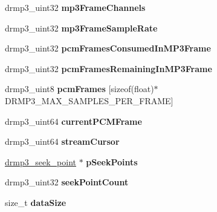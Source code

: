 \begin{DoxyCompactItemize}
\item 
\hypertarget{structdrmp3_aec49fe9de2778f11bb2013957fc12029}{drmp3\-\_\-uint32 {\bfseries mp3\-Frame\-Channels}}\label{structdrmp3_aec49fe9de2778f11bb2013957fc12029}

\item 
\hypertarget{structdrmp3_ade76fd0c402a551a22c0a06a0b8eb5dc}{drmp3\-\_\-uint32 {\bfseries mp3\-Frame\-Sample\-Rate}}\label{structdrmp3_ade76fd0c402a551a22c0a06a0b8eb5dc}

\item 
\hypertarget{structdrmp3_a57052dc84770d6a2789b40388101af39}{drmp3\-\_\-uint32 {\bfseries pcm\-Frames\-Consumed\-In\-M\-P3\-Frame}}\label{structdrmp3_a57052dc84770d6a2789b40388101af39}

\item 
\hypertarget{structdrmp3_ae3017f4bdc17a2df39c4f635bbc875d6}{drmp3\-\_\-uint32 {\bfseries pcm\-Frames\-Remaining\-In\-M\-P3\-Frame}}\label{structdrmp3_ae3017f4bdc17a2df39c4f635bbc875d6}

\item 
\hypertarget{structdrmp3_a023dfacc5f195ba44287ed3ddefffe16}{drmp3\-\_\-uint8 {\bfseries pcm\-Frames} \mbox{[}sizeof(float)$\ast$D\-R\-M\-P3\-\_\-\-M\-A\-X\-\_\-\-S\-A\-M\-P\-L\-E\-S\-\_\-\-P\-E\-R\-\_\-\-F\-R\-A\-M\-E\mbox{]}}\label{structdrmp3_a023dfacc5f195ba44287ed3ddefffe16}

\item 
\hypertarget{structdrmp3_a6500ce0ed15aa4b63622ca9f10b8011e}{drmp3\-\_\-uint64 {\bfseries current\-P\-C\-M\-Frame}}\label{structdrmp3_a6500ce0ed15aa4b63622ca9f10b8011e}

\item 
\hypertarget{structdrmp3_a89971e4af6f62c59f99a1c908690efe3}{drmp3\-\_\-uint64 {\bfseries stream\-Cursor}}\label{structdrmp3_a89971e4af6f62c59f99a1c908690efe3}

\item 
\hypertarget{structdrmp3_ae13ed70982604f33706b9f4a3fd40e76}{\hyperlink{structdrmp3__seek__point}{drmp3\-\_\-seek\-\_\-point} $\ast$ {\bfseries p\-Seek\-Points}}\label{structdrmp3_ae13ed70982604f33706b9f4a3fd40e76}

\item 
\hypertarget{structdrmp3_ae9095cc4be150c2ed98c9a4f53041f19}{drmp3\-\_\-uint32 {\bfseries seek\-Point\-Count}}\label{structdrmp3_ae9095cc4be150c2ed98c9a4f53041f19}

\item 
\hypertarget{structdrmp3_ad1d4cb4cb6209977963313a27f34c3bd}{size\-\_\-t {\bfseries data\-Size}}\label{structdrmp3_ad1d4cb4cb6209977963313a27f34c3bd}


\end{DoxyCompactItemize}
